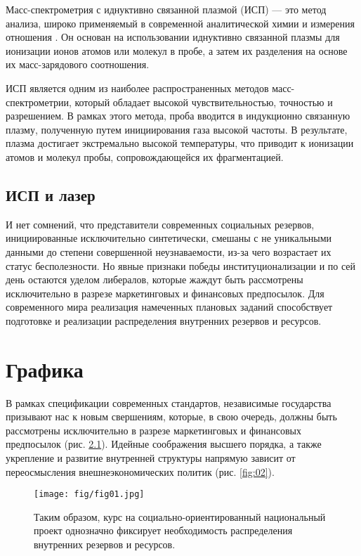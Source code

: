 \documentclass{esdiploma}
\begin{document}
Масс-спектрометрия с иднуктивно связанной плазмой (ИСП) --- это метод анализа, широко применяемый в современной аналитической химии и измерения отношения \upb. Он основан на использовании иднуктивно связанной плазмы для ионизации ионов атомов или молекул в пробе, а затем их разделения на основе их масс-зарядового соотношения.

ИСП является одним из наиболее распространенных методов масс-спектрометрии, который    обладает высокой чувствительностью, точностью и разрешением. В рамках этого метода, проба вводится в индукционно связанную плазму, полученную путем инициирования газа высокой частоты. В результате, плазма достигает экстремально высокой температуры, что приводит к ионизации атомов и молекул пробы, сопровождающейся их фрагментацией.

\section{ИСП и лазер}

И нет сомнений, что представители современных социальных резервов, инициированные исключительно синтетически, смешаны с не уникальными данными до степени совершенной неузнаваемости, из-за чего возрастает их статус бесполезности. Но явные признаки победы институционализации и по сей день остаются уделом либералов, которые жаждут быть рассмотрены исключительно в разрезе маркетинговых и финансовых предпосылок. Для современного мира реализация намеченных плановых заданий способствует подготовке и реализации распределения внутренних резервов и ресурсов.


\chapter{Графика}

 В рамках спецификации современных стандартов, независимые государства призывают нас к новым свершениям, которые, в свою очередь, должны быть рассмотрены исключительно в разрезе маркетинговых и финансовых предпосылок (рис. \ref{fig:01}). Идейные соображения высшего порядка, а также укрепление и развитие внутренней структуры напрямую зависит от переосмысления внешнеэкономических политик (рис. \ref{fig:02}).

\begin{figure}[h!]
	\centering
	\texttt{[image: fig/fig01.jpg]}
	\caption{Таким образом, курс на социально-ориентированный национальный проект однозначно фиксирует необходимость распределения внутренних резервов и ресурсов.}
	\label{fig:01}
\end{figure}
\end{document}

